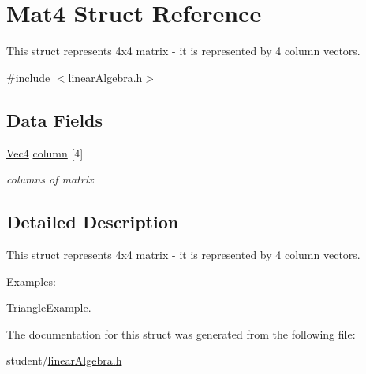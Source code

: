 \hypertarget{structMat4}{}\section{Mat4 Struct Reference}
\label{structMat4}


This struct represents 4x4 matrix -\/ it is represented by 4 column vectors.  




{\ttfamily \#include $<$linear\+Algebra.\+h$>$}

\subsection*{Data Fields}
\begin{DoxyCompactItemize}
\item 
\hyperlink{structVec4}{Vec4} \hyperlink{structMat4_a89c6922a5ca3584062e9841090709592}{column} \mbox{[}4\mbox{]}\hypertarget{structMat4_a89c6922a5ca3584062e9841090709592}{}\label{structMat4_a89c6922a5ca3584062e9841090709592}

\begin{DoxyCompactList}\small\item\em columns of matrix \end{DoxyCompactList}\end{DoxyCompactItemize}


\subsection{Detailed Description}
This struct represents 4x4 matrix -\/ it is represented by 4 column vectors. \begin{Desc}
\item[Examples\+: ]\par
\hyperlink{TriangleExample-example}{Triangle\+Example}.\end{Desc}


The documentation for this struct was generated from the following file\+:\begin{DoxyCompactItemize}
\item 
student/\hyperlink{linearAlgebra_8h}{linear\+Algebra.\+h}\end{DoxyCompactItemize}
